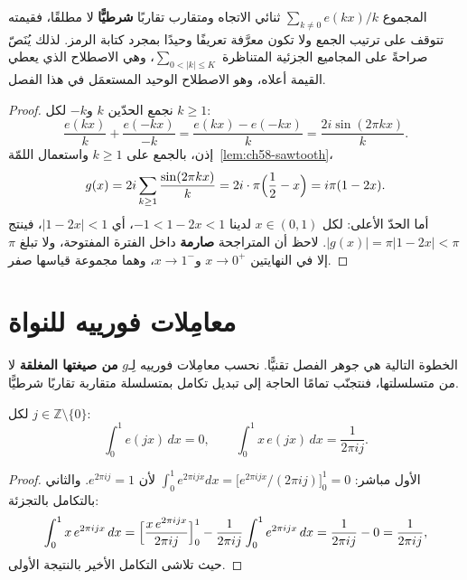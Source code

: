 \begin{remark}
\label{rem:ch58-symmetric-summation}
المجموع \(\sum_{k\ne0}e(kx)/k\) ثنائي الاتجاه ومتقارب تقاربًا
\textbf{شرطيًّا} لا مطلقًا، فقيمته تتوقف على ترتيب الجمع ولا تكون
معرَّفة تعريفًا وحيدًا بمجرد كتابة الرمز. لذلك يُنَصّ صراحةً على
المجاميع الجزئية المتناظرة \(\sum_{0<\lvert k\rvert\le K}\)، وهي
الاصطلاح الذي يعطي القيمة أعلاه، وهو الاصطلاح الوحيد المستعمَل في هذا
الفصل.
\end{remark}

\begin{proof}
نجمع الحدّين \(k\) و\(-k\) لكل \(k\ge1\):
\[
\frac{e(kx)}{k}+\frac{e(-kx)}{-k}
=\frac{e(kx)-e(-kx)}{k}
=\frac{2i\sin(2\pi kx)}{k}.
\]
إذن، بالجمع على \(k\ge1\) واستعمال اللمّة~\ref{lem:ch58-sawtooth}،
\[
g(x)=2i\sum_{k\ge1}\frac{\sin(2\pi kx)}{k}
=2i\cdot\pi\Bigl(\frac12-x\Bigr)
=i\pi(1-2x).
\]
أما الحدّ الأعلى: لكل \(x\in(0,1)\) لدينا \(-1<1-2x<1\)، أي
\(\lvert1-2x\rvert<1\)، فينتج \(\lvert g(x)\rvert=\pi\lvert1-2x\rvert<\pi\).
لاحظ أن المتراجحة \textbf{صارمة} داخل الفترة المفتوحة، ولا تبلغ \(\pi\)
إلا في النهايتين \(x\to0^{+}\) و\(x\to1^{-}\)، وهما مجموعة قياسها صفر.
\end{proof}

\section{معامِلات فورييه للنواة}

الخطوة التالية هي جوهر الفصل تقنيًّا. نحسب معامِلات فورييه لِـ\(g\)
\textbf{من صيغتها المغلقة} لا من متسلسلتها، فنتجنّب تمامًا الحاجة إلى
تبديل تكامل بمتسلسلة متقاربة تقاربًا شرطيًّا.

\begin{lemma}
\label{lem:ch58-elementary-integrals}
\provedhere
لكل \(j\in\mathbb{Z}\setminus\{0\}\):
\[
\int_0^1e(jx)\,dx=0,
\qquad
\int_0^1x\,e(jx)\,dx=\frac{1}{2\pi ij}.
\]
\end{lemma}

\begin{proof}
الأول مباشر: \(\int_0^1e^{2\pi ijx}dx=\bigl[e^{2\pi ijx}/(2\pi ij)\bigr]_0^1=0\)
لأن \(e^{2\pi ij}=1\). والثاني بالتكامل بالتجزئة:
\[
\int_0^1x\,e^{2\pi ijx}\,dx
=\Bigl[\frac{x\,e^{2\pi ijx}}{2\pi ij}\Bigr]_0^1
-\frac{1}{2\pi ij}\int_0^1e^{2\pi ijx}\,dx
=\frac{1}{2\pi ij}-0
=\frac{1}{2\pi ij},
\]
حيث تلاشى التكامل الأخير بالنتيجة الأولى.
\end{proof}

